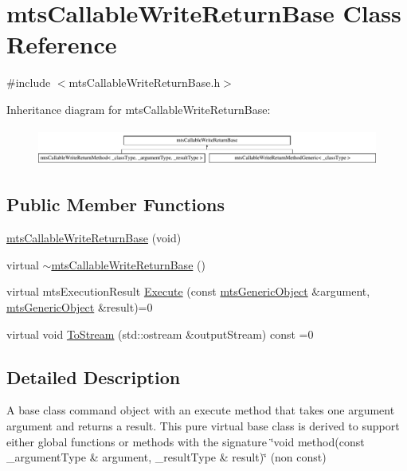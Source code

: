 \hypertarget{classmts_callable_write_return_base}{}\section{mts\+Callable\+Write\+Return\+Base Class Reference}
\label{classmts_callable_write_return_base}


{\ttfamily \#include $<$mts\+Callable\+Write\+Return\+Base.\+h$>$}

Inheritance diagram for mts\+Callable\+Write\+Return\+Base\+:\begin{figure}[H]
\begin{center}
\leavevmode
\includegraphics[height=1.241685cm]{dd/de4/classmts_callable_write_return_base}
\end{center}
\end{figure}
\subsection*{Public Member Functions}
\begin{DoxyCompactItemize}
\item 
\hyperlink{classmts_callable_write_return_base_a74a9331e5d5a433d39c57d3230c77cf0}{mts\+Callable\+Write\+Return\+Base} (void)
\item 
virtual \hyperlink{classmts_callable_write_return_base_a98d1e91ce6aa2b01eba517add581227a}{$\sim$mts\+Callable\+Write\+Return\+Base} ()
\item 
virtual mts\+Execution\+Result \hyperlink{classmts_callable_write_return_base_a27af887e0c24f638cc8e21f1bf749065}{Execute} (const \hyperlink{classmts_generic_object}{mts\+Generic\+Object} \&argument, \hyperlink{classmts_generic_object}{mts\+Generic\+Object} \&result)=0
\item 
virtual void \hyperlink{classmts_callable_write_return_base_a56bfb09f0ebff160d2930f1c8521fe0e}{To\+Stream} (std\+::ostream \&output\+Stream) const =0
\end{DoxyCompactItemize}


\subsection{Detailed Description}
A base class command object with an execute method that takes one argument argument and returns a result. This pure virtual base class is derived to support either global functions or methods with the signature \char`\"{}void method(const \+\_\+argument\+Type \& argument,
\+\_\+result\+Type \& result)\char`\"{} (non const) 

